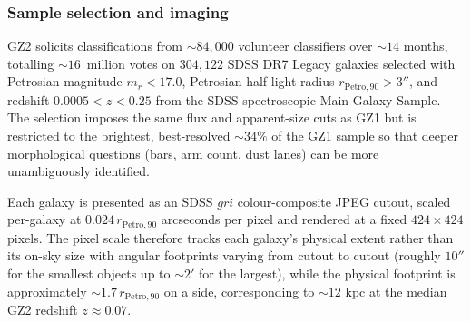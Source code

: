 \documentclass[10pt,preprint2]{aastex}
\begin{document}
\subsubsection{Sample selection and imaging}

GZ2 \citep{Willett2013} solicits classifications from $\sim 84{,}000$ volunteer classifiers over $\sim 14$ months, totalling $\sim 16$~million votes on $304{,}122$ SDSS DR7 Legacy galaxies selected with Petrosian magnitude $m_r < 17.0$, Petrosian half-light radius $r_{\mathrm{Petro,90}} > 3''$, and redshift $0.0005 < z < 0.25$ from the SDSS spectroscopic Main Galaxy Sample. The selection imposes the same flux and apparent-size cuts as GZ1 but is restricted to the brightest, best-resolved $\sim 34\%$ of the GZ1 sample so that deeper morphological questions (bars, arm count, dust lanes) can be more unambiguously identified. 

Each galaxy is presented as an SDSS $gri$ colour-composite JPEG cutout, scaled per-galaxy at $0.024\,r_{\mathrm{Petro,90}}$ arcseconds per pixel and rendered at a fixed $424\times424$ pixels. The pixel scale therefore tracks each galaxy's physical extent rather than its on-sky size with angular footprints varying from cutout to cutout (roughly $10''$ for the smallest objects up to $\sim 2'$ for the largest), while the physical footprint is approximately $\sim 1.7\,r_{\mathrm{Petro,90}}$ on a side, corresponding to $\sim 12$ kpc at the median GZ2 redshift $z \approx 0.07$.
\end{document}
